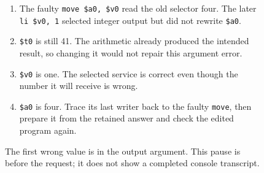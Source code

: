 \begin{figure}[htbp]
\begin{minipage}{\linewidth}
    \small
    \begin{enumerate}
      \item The faulty \texttt{move \$a0, \$v0} read the old selector four. The later \texttt{li \$v0, 1} selected integer output but did not rewrite \texttt{\$a0}.
      \item \texttt{\$t0} is still 41. The arithmetic already produced the intended result, so changing it would not repair this argument error.
      \item \texttt{\$v0} is one. The selected service is correct even though the number it will receive is wrong.
      \item \texttt{\$a0} is four. Trace its last writer back to the faulty \texttt{move}, then prepare it from the retained answer and check the edited program again.
    \end{enumerate}
  \end{minipage}
  \caption{The first wrong value is in the output argument. This pause is before the request; it does not show a completed console transcript.}
  \label{fig:revision-first-program-wrong-argument}
\end{figure}
